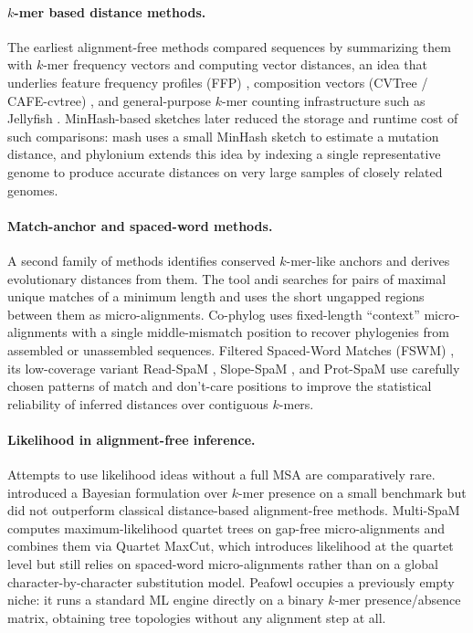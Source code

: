 \paragraph{$k$-mer based distance methods.}
The earliest alignment-free methods compared sequences by summarizing them
with $k$-mer frequency vectors and computing vector distances, an idea that
underlies feature frequency profiles (FFP) \citep{sims2009ffp}, composition
vectors (CVTree / CAFE-cvtree) \citep{gao2007cvtree, lu2017cafe}, and
general-purpose $k$-mer counting infrastructure such as Jellyfish
\citep{marcais2011jellyfish}. MinHash-based sketches later reduced the
storage and runtime cost of such comparisons: mash \citep{ondov2016mash}
uses a small MinHash sketch to estimate a mutation distance, and phylonium
\citep{klotzl2020phylonium} extends this idea by indexing a single
representative genome to produce accurate distances on very large samples of
closely related genomes.

\paragraph{Match-anchor and spaced-word methods.}
A second family of methods identifies conserved $k$-mer-like anchors and
derives evolutionary distances from them. The tool andi
\citep{haubold2015andi} searches for pairs of maximal unique matches of a
minimum length and uses the short ungapped regions between them as
micro-alignments. Co-phylog \citep{yi2013cophylog} uses fixed-length
``context'' micro-alignments with a single middle-mismatch position to
recover phylogenies from assembled or unassembled sequences. Filtered
Spaced-Word Matches (FSWM) \citep{morgenstern2015spacedwords}, its
low-coverage variant Read-SpaM \citep{lau2019readspam}, Slope-SpaM
\citep{rohling2020slopespam}, and Prot-SpaM \citep{leimeister2019protspam}
use carefully chosen patterns of match and don't-care positions to improve
the statistical reliability of inferred distances over contiguous $k$-mers.

\paragraph{Likelihood in alignment-free inference.}
Attempts to use likelihood ideas without a full MSA are comparatively rare.
\citet{hohl2007alignmentfree} introduced a Bayesian formulation over $k$-mer
presence on a small benchmark but did not outperform classical distance-based
alignment-free methods. Multi-SpaM \citep{dencker2020multispam} computes
maximum-likelihood quartet trees on gap-free micro-alignments and combines
them via Quartet MaxCut, which introduces likelihood at the quartet level
but still relies on spaced-word micro-alignments rather than on a global
character-by-character substitution model. Peafowl occupies a
previously empty niche: it runs a standard ML engine
\citep{stamatakis2014raxml} directly on a binary $k$-mer presence/absence
matrix, obtaining tree topologies without any alignment step at all.

